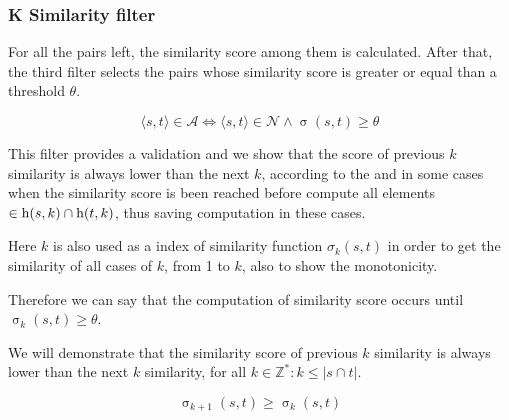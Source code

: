 

\subsubsection{K Similarity filter} \label{mfc:filter}

For all the pairs left, the similarity score among them is calculated. After that, the third filter selects the pairs whose similarity score is greater or equal than a threshold $\theta$. 

\begin{equation}
	\langle s,t \rangle \in \mathcal{A} \Leftrightarrow \langle s,t \rangle \in \mathcal{N} \wedge \upsigma(s,t) \geq \theta
\end{equation}

This filter provides a validation and we show that the score of previous $k$ similarity is always lower than the next $k$, according to the  and in some cases when the similarity score is been reached before compute all elements $\in \textnormal{h}(s,k) \cap \textnormal{h}(t,k)$, thus saving computation in these cases. 

Here $k$ is also used as a index of similarity function $\sigma_k(s,t)$ in order to get the similarity of all cases of $k$, from 1 to $k$, also to show the monotonicity.

Therefore we can say that the computation of similarity score occurs until $\upsigma_k(s,t) \geq \theta$.

We will demonstrate that the similarity score of previous $k$ similarity is always lower than the next $k$ similarity, for all $k \in \mathbb{Z}^* : k \leq |s \cap t|$. 

\begin{equation}\label{eq:m1}
	\upsigma_{k+1}(s,t) \geq \upsigma_{k}(s,t)
\end{equation}

